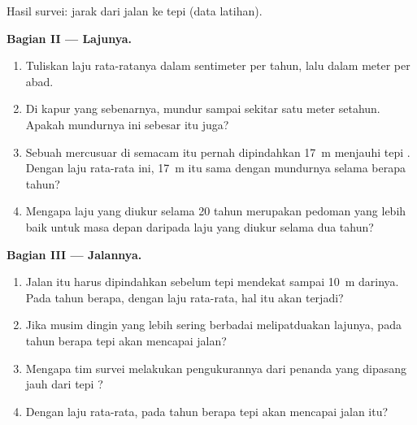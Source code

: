 \begin{problem}
\begin{omfigure}

{\small Hasil survei: jarak dari jalan  ke tepi  (data
latihan).}
\label{fig:g9:landforms:survey}
\end{omfigure}

\noindent\textbf{Bagian II --- Lajunya.}\par\nopagebreak
\begin{enumerate}[resume, beginpenalty=10000]
  \item Tuliskan laju rata-ratanya dalam sentimeter per tahun, lalu dalam
        meter per abad.
  \item Di  kapur yang sebenarnya,  mundur sampai sekitar
        satu meter setahun. Apakah mundurnya  ini sebesar itu juga?
  \item Sebuah mercusuar di  semacam itu pernah dipindahkan
        \qty{17}{m} menjauhi tepi . Dengan laju rata-rata  ini,
        \qty{17}{m} itu sama dengan mundurnya selama berapa tahun?
  \item Mengapa laju yang diukur selama 20 tahun merupakan pedoman yang
        lebih baik untuk masa depan daripada laju yang diukur selama dua
        tahun?
\end{enumerate}

\noindent\textbf{Bagian III --- Jalannya.}\par\nopagebreak
\begin{enumerate}[resume, beginpenalty=10000]
  \item Jalan itu harus dipindahkan sebelum tepi  mendekat sampai
        \qty{10}{m} darinya. Pada tahun berapa, dengan laju rata-rata, hal
        itu akan terjadi?
  \item Jika musim dingin yang lebih sering berbadai melipatduakan lajunya,
        pada tahun berapa tepi  akan mencapai jalan?
  \item Mengapa tim survei melakukan pengukurannya dari penanda yang
        dipasang jauh dari tepi ?
  \item Dengan laju rata-rata, pada tahun berapa tepi  akan mencapai
        jalan itu?
\end{enumerate}
\end{problem}
